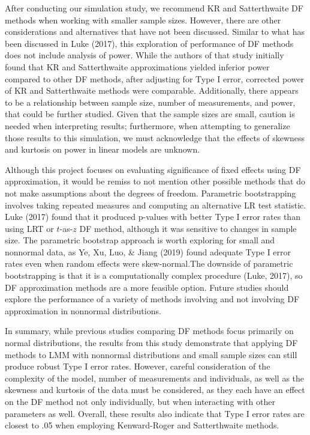 \documentclass[12pt, twoside]{amherstthesis}
\begin{document}
After conducting our simulation study, we recommend KR and Satterthwaite DF methods when working with smaller sample sizes. However, there are other considerations and alternatives that have not been discussed. Similar to what has been discussed in Luke (2017), this exploration of performance of DF methods does not include analysis of power. While the authors of that study initially found that KR and Satterthwaite approximations yielded inferior power compared to other DF methods, after adjusting for Type I error, corrected power of KR and Satterthwaite methods were comparable. Additionally, there appears to be a relationship between sample size, number of measurements, and power, that could be further studied. Given that the sample sizes are small, caution is needed when interpreting results; furthermore, when attempting to generalize those results to this simulation, we must acknowledge that the effects of skewness and kurtosis on power in linear models are unknown.

Although this project focuses on evaluating significance of fixed effects using DF approximation, it would be remiss to not mention other possible methods that do not make assumptions about the degrees of freedom. Parametric bootstrapping involves taking repeated measures and computing an alternative LR test statistic. Luke (2017) found that it produced p-values with better Type I error rates than using LRT or \(t\)-as-\(z\) DF method, although it was sensitive to changes in sample size. The parametric bootstrap approach is worth exploring for small and nonnormal data, as Ye, Xu, Luo, \& Jiang (2019) found adequate Type I error rates even when random effects were skew-normal.The downside of parametric bootstrapping is that it is a computationally complex procedure (Luke, 2017), so DF approximation methods are a more feasible option. Future studies should explore the performance of a variety of methods involving and not involving DF approximation in nonnormal distributions.

In summary, while previous studies comparing DF methods focus primarily on normal distributions, the results from this study demonstrate that applying DF methods to LMM with nonnormal distributions and small sample sizes can still produce robust Type I error rates. However, careful consideration of the complexity of the model, number of measurements and individuals, as well as the skewness and kurtosis of the data must be considered, as they each have an effect on the DF method not only individually, but when interacting with other parameters as well. Overall, these results also indicate that Type I error rates are closest to .05 when employing Kenward-Roger and Satterthwaite methods.
\end{document}
